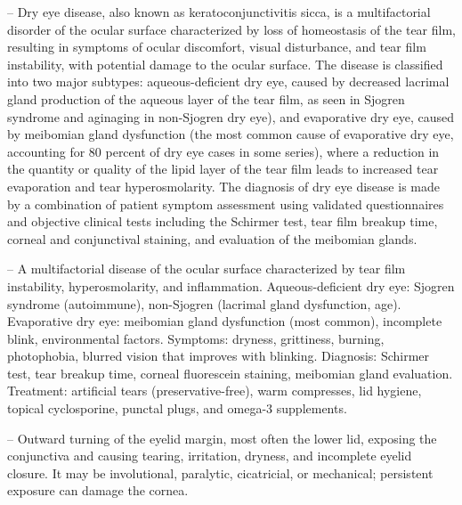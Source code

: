 -- Dry eye disease, also known as keratoconjunctivitis sicca, is a multifactorial disorder of the ocular surface characterized by loss of homeostasis of the tear film, resulting in symptoms of ocular discomfort, visual disturbance, and tear film instability, with potential damage to the ocular surface. The disease is classified into two major subtypes: aqueous-deficient dry eye, caused by decreased lacrimal gland production of the aqueous layer of the tear film, as seen in Sjogren syndrome and aginaging in non-Sjogren dry eye), and evaporative dry eye, caused by meibomian gland dysfunction (the most common cause of evaporative dry eye, accounting for 80 percent of dry eye cases in some series), where a reduction in the quantity or quality of the lipid layer of the tear film leads to increased tear evaporation and tear hyperosmolarity. The diagnosis of dry eye disease is made by a combination of patient symptom assessment using validated questionnaires and objective clinical tests including the Schirmer test, tear film breakup time, corneal and conjunctival staining, and evaluation of the meibomian glands.

-- A multifactorial disease of the ocular surface characterized by tear film instability, hyperosmolarity, and inflammation. Aqueous-deficient dry eye: Sjogren syndrome (autoimmune), non-Sjogren (lacrimal gland dysfunction, age). Evaporative dry eye: meibomian gland dysfunction (most common), incomplete blink, environmental factors. Symptoms: dryness, grittiness, burning, photophobia, blurred vision that improves with blinking. Diagnosis: Schirmer test, tear breakup time, corneal fluorescein staining, meibomian gland evaluation. Treatment: artificial tears (preservative-free), warm compresses, lid hygiene, topical cyclosporine, punctal plugs, and omega-3 supplements.

-- Outward turning of the eyelid margin, most often the lower lid, exposing the conjunctiva and causing tearing, irritation, dryness, and incomplete eyelid closure. It may be involutional, paralytic, cicatricial, or mechanical; persistent exposure can damage the cornea.

